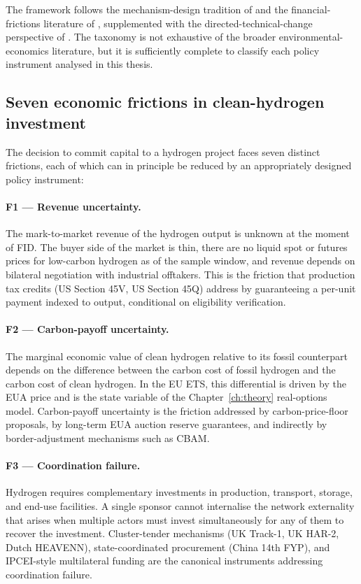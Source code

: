 The framework follows the mechanism-design tradition of \cite{laffont1993theory} and the financial-frictions literature of \cite{holmstrom1997financial,holmstrom1998private}, supplemented with the directed-technical-change perspective of \cite{acemoglu2012environment}. The taxonomy is not exhaustive of the broader environmental-economics literature, but it is sufficiently complete to classify each policy instrument analysed in this thesis.

\subsection{Seven economic frictions in clean-hydrogen investment}
\label{sec:ch3-frictions}

The decision to commit capital to a hydrogen project faces seven distinct frictions, each of which can in principle be reduced by an appropriately designed policy instrument:

\paragraph{F1 --- Revenue uncertainty.} The mark-to-market revenue of the hydrogen output is unknown at the moment of FID. The buyer side of the market is thin, there are no liquid spot or futures prices for low-carbon hydrogen as of the sample window, and revenue depends on bilateral negotiation with industrial offtakers. This is the friction that production tax credits (US Section 45V, US Section 45Q) address by guaranteeing a per-unit payment indexed to output, conditional on eligibility verification.

\paragraph{F2 --- Carbon-payoff uncertainty.} The marginal economic value of clean hydrogen relative to its fossil counterpart depends on the difference between the carbon cost of fossil hydrogen and the carbon cost of clean hydrogen. In the EU ETS, this differential is driven by the EUA price and is the state variable of the Chapter~\ref{ch:theory} real-options model. Carbon-payoff uncertainty is the friction addressed by carbon-price-floor proposals, by long-term EUA auction reserve guarantees, and indirectly by border-adjustment mechanisms such as CBAM.

\paragraph{F3 --- Coordination failure.} Hydrogen requires complementary investments in production, transport, storage, and end-use facilities. A single sponsor cannot internalise the network externality that arises when multiple actors must invest simultaneously for any of them to recover the investment. Cluster-tender mechanisms (UK Track-1, UK HAR-2, Dutch HEAVENN), state-coordinated procurement (China 14th FYP), and IPCEI-style multilateral funding are the canonical instruments addressing coordination failure.

